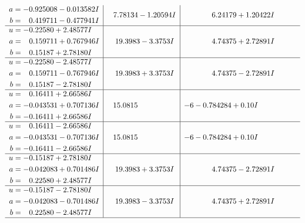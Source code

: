 \documentclass[1p]{elsarticle_modified}
\theoremstyle{definition}
\begin{document}
$$\begin{array}{c|c|c}
\begin{aligned}
a &= -0.925008 - 0.013582 I \\
b &= \phantom{-}0.419711 - 0.477941 I\end{aligned}
 & \phantom{-}7.78134 - 1.20594 I & \phantom{-}6.24179 + 1.20422 I \\ \hline\begin{aligned}
u &= -0.22580 + 2.48577 I \\
a &= \phantom{-}0.159711 + 0.767946 I \\
b &= \phantom{-}0.15187 + 2.78180 I\end{aligned}
 & \phantom{-}19.3983 - 3.3753 I & \phantom{-}4.74375 + 2.72891 I \\ \hline\begin{aligned}
u &= -0.22580 - 2.48577 I \\
a &= \phantom{-}0.159711 - 0.767946 I \\
b &= \phantom{-}0.15187 - 2.78180 I\end{aligned}
 & \phantom{-}19.3983 + 3.3753 I & \phantom{-}4.74375 - 2.72891 I \\ \hline\begin{aligned}
u &= \phantom{-}0.16411 + 2.66586 I \\
a &= -0.043531 + 0.707136 I \\
b &= -0.16411 + 2.66586 I\end{aligned}
 & \phantom{-}15.0815\phantom{ +0.000000I} &                  -6
-0.784284 + 0. 10   I\phantom{ +0.000000I} \\ \hline\begin{aligned}
u &= \phantom{-}0.16411 - 2.66586 I \\
a &= -0.043531 - 0.707136 I \\
b &= -0.16411 - 2.66586 I\end{aligned}
 & \phantom{-}15.0815\phantom{ +0.000000I} &                  -6
-0.784284 + 0. 10   I\phantom{ +0.000000I} \\ \hline\begin{aligned}
u &= -0.15187 + 2.78180 I \\
a &= -0.042083 + 0.701486 I \\
b &= \phantom{-}0.22580 + 2.48577 I\end{aligned}
 & \phantom{-}19.3983 + 3.3753 I & \phantom{-}4.74375 - 2.72891 I \\ \hline\begin{aligned}
u &= -0.15187 - 2.78180 I \\
a &= -0.042083 - 0.701486 I \\
b &= \phantom{-}0.22580 - 2.48577 I\end{aligned}
 & \phantom{-}19.3983 - 3.3753 I & \phantom{-}4.74375 + 2.72891 I\\
 \hline 
 \end{array}$$\newpage\newpage\renewcommand{\arraystretch}{1}
\end{document}
